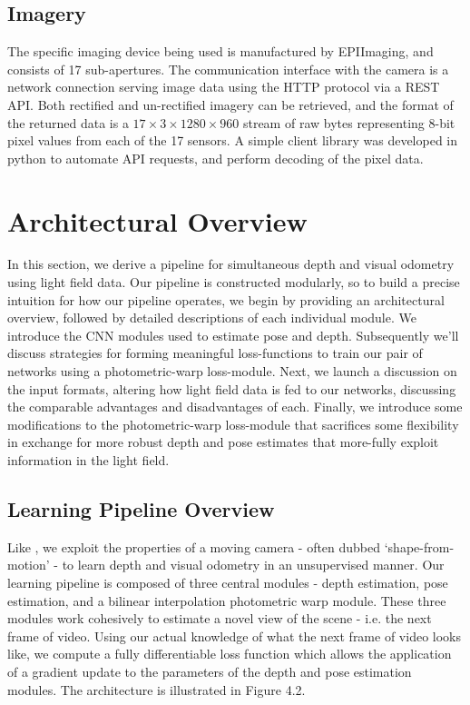 \subsection{Imagery}
The specific imaging device being used is manufactured by EPIImaging, and consists of 17 sub-apertures. The communication interface with the camera is a network connection serving image data using the HTTP protocol via a REST API. Both rectified and un-rectified imagery can be retrieved, and the format of the returned data is a $17\times 3 \times 1280 \times 960$ stream of raw bytes representing 8-bit pixel values from each of the 17 sensors. A simple client library was developed in python to automate API requests, and perform decoding of the pixel data.

\section{Architectural Overview}
In this section, we derive a pipeline for simultaneous depth and visual odometry using light field data. Our pipeline is constructed modularly, so to build a precise intuition for how our pipeline operates, we begin by providing an architectural overview, followed by detailed descriptions of each individual module. We introduce the CNN modules used to estimate pose and depth. Subsequently we'll discuss strategies for forming meaningful loss-functions to train our pair of networks using a photometric-warp loss-module. Next, we launch a discussion on the input formats, altering how light field data is fed to our networks, discussing the comparable advantages and disadvantages of each. Finally, we introduce some modifications to the photometric-warp loss-module that sacrifices some flexibility in exchange for more robust depth and pose estimates that more-fully exploit information in the light field. 

\subsection{Learning Pipeline Overview}
Like \cite{zhou2017unsupervised}, we exploit the properties of a moving camera - often dubbed `shape-from-motion' - to learn depth and visual odometry in an unsupervised manner. Our learning pipeline is composed of three central modules - depth estimation, pose estimation, and a bilinear interpolation photometric warp module. These three modules work cohesively to estimate a novel view of the scene - i.e. the next frame of video. Using our actual knowledge of what the next frame of video looks like, we compute a fully differentiable loss function which allows the application of a gradient update to the parameters of the depth and pose estimation modules. The architecture is illustrated in Figure 4.2.

